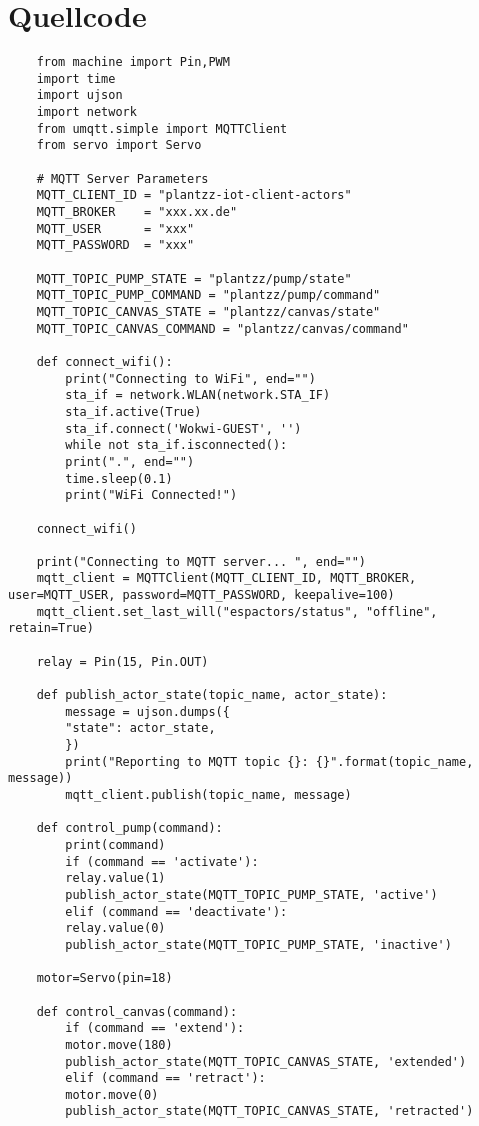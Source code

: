 \chapter{Quellcode}

\begin{listing}[!ht]
\begin{verbatim}
    from machine import Pin,PWM
    import time
    import ujson
    import network
    from umqtt.simple import MQTTClient 
    from servo import Servo
    
    # MQTT Server Parameters
    MQTT_CLIENT_ID = "plantzz-iot-client-actors"
    MQTT_BROKER    = "xxx.xx.de"
    MQTT_USER      = "xxx"
    MQTT_PASSWORD  = "xxx"
    
    MQTT_TOPIC_PUMP_STATE = "plantzz/pump/state"
    MQTT_TOPIC_PUMP_COMMAND = "plantzz/pump/command"
    MQTT_TOPIC_CANVAS_STATE = "plantzz/canvas/state"
    MQTT_TOPIC_CANVAS_COMMAND = "plantzz/canvas/command"
    
    def connect_wifi():
        print("Connecting to WiFi", end="")
        sta_if = network.WLAN(network.STA_IF)
        sta_if.active(True)
        sta_if.connect('Wokwi-GUEST', '')
        while not sta_if.isconnected():
        print(".", end="")
        time.sleep(0.1)
        print("WiFi Connected!")
    
    connect_wifi()
    
    print("Connecting to MQTT server... ", end="")
    mqtt_client = MQTTClient(MQTT_CLIENT_ID, MQTT_BROKER, user=MQTT_USER, password=MQTT_PASSWORD, keepalive=100)
    mqtt_client.set_last_will("espactors/status", "offline", retain=True)
    
    relay = Pin(15, Pin.OUT)
    
    def publish_actor_state(topic_name, actor_state):
        message = ujson.dumps({
        "state": actor_state,
        })
        print("Reporting to MQTT topic {}: {}".format(topic_name, message))
        mqtt_client.publish(topic_name, message)
    
    def control_pump(command):
        print(command)
        if (command == 'activate'):
        relay.value(1)
        publish_actor_state(MQTT_TOPIC_PUMP_STATE, 'active')
        elif (command == 'deactivate'):
        relay.value(0)
        publish_actor_state(MQTT_TOPIC_PUMP_STATE, 'inactive')
    
    motor=Servo(pin=18)
    
    def control_canvas(command):
        if (command == 'extend'):
        motor.move(180)
        publish_actor_state(MQTT_TOPIC_CANVAS_STATE, 'extended')
        elif (command == 'retract'):
        motor.move(0)
        publish_actor_state(MQTT_TOPIC_CANVAS_STATE, 'retracted')
    

\end{verbatim}
\end{listing}
